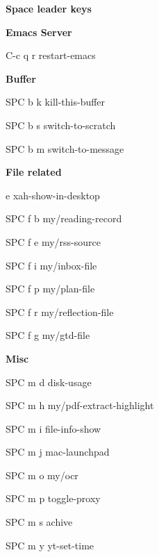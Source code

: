 \documentclass[10pt]{article}
\renewcommand\section[1]{\bigskip\par\textbf{\color{heading}\large#1}\smallskip}
\renewcommand\subsection[1]{\smallskip\par\textbf{\color{heading}#1}}
\begin{document}
\begin{multicols}{4}
  \section{Space leader keys}
  \subsection{Emacs Server}
  \begin{keylist}
    \item[C-c q r] restart-emacs
    \end{keylist}

  \subsection{Buffer}
  \begin{keylist}
    \item[SPC b k] kill-this-buffer
    \item[SPC b s] switch-to-scratch
    \item[SPC b m] switch-to-message
  \end{keylist}

  \subsection{File related}
  \begin{keylist}
    \item[e] xah-show-in-desktop
    \item[SPC f b] my/reading-record
    \item[SPC f e] my/rss-source
    \item[SPC f i] my/inbox-file
    \item[SPC f p] my/plan-file
    \item[SPC f r] my/reflection-file
    \item[SPC f g] my/gtd-file
  \end{keylist}

  \subsection{Misc}
  \begin{keylist}
    \item[SPC m d] disk-usage
    \item[SPC m h] my/pdf-extract-highlight
    \item[SPC m i] file-info-show
    \item[SPC m j] mac-launchpad
    \item[SPC m o] my/ocr
    \item[SPC m p] toggle-proxy
    \item[SPC m s] achive
    \item[SPC m y] yt-set-time
  \end{keylist}


\end{multicols}
\end{document}
